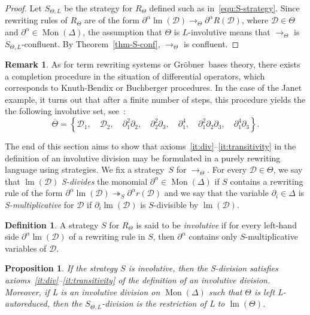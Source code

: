 \documentclass[11pt]{article}
\newtheorem{proposition}[theorem]{Proposition}
\theoremstyle{definition}
\newtheorem{definition}[theorem]{Definition}
\newtheorem{remark}[theorem]{Remark}
\newcommand\G{Gröbner}
\newcommand\D{\mathcal{D}}
\DeclareMathOperator{\lm}{lm}
\newcommand\monBasis{\Mon(\Delta)}
\DeclareMathOperator{\Mon}{Mon}
\newcommand\parS{\twoheadrightarrow_S}
\newcommand\rewTheta{\to_\Theta}
\newcommand\RTheta{R_{\Theta}}
\newcommand\SThetaL{S_{\Theta,L}}
\begin{document}
\begin{proof}
  Let $\SThetaL$ be the strategy for $\RTheta$ defined such as
  in~\eqref{equ:S-strategy}. Since rewriting rules of $\RTheta$ are of
  the form $\partial^\alpha\lm(\D)\rewTheta\partial^\alpha R(\D)$, where
  $\D\in\Theta$ and $\partial^\alpha\in\monBasis$, the assumption that
  $\Theta$ is $L$-involutive means that $\rewTheta$ is
  $\SThetaL$-confluent. By Theorem~\ref{thm-S-conf}, $\rewTheta$ is
  confluent.
\end{proof}
\smallskip

\begin{remark}
  As for term rewriting systems or \G\ bases theory, there exists a
  completion procedure in the situation of differential operators, which
  corresponds to Knuth-Bendix or Buchberger procedures. In the case of 
  the Janet example, it turns out that after a finite number of steps,
  this procedure yields the the following involutive set,
  see~\cite{MR1308976}:
  \[\overline{\Theta}=\left\{\D_1,\quad\D_2,\quad\partial_1^2\partial_2,
  \quad\partial_2^2\partial_3,\quad\partial_1^4,\quad\partial_1^2
  \partial_2\partial_3,\quad\partial_1^4\partial_3\right\}.\]
\end{remark}
\medskip

The end of this section aims to show that
axioms~\ref{it:div}--\ref{it:transitivity} in the definition of an
involutive division may be formulated in a purely rewriting language
using strategies. We fix a strategy~$S$ for $\rewTheta$. For every
$\D\in\Theta$, we say that $\lm(\D)$ {\em S-divides} the monomial
$\partial^\alpha\in\monBasis$ if $S$ contains a rewriting rule of the
form $\partial^\alpha\lm(\D)\parS\partial^\alpha r(\D)$ and we say that
the variable $\partial_i\in\Delta$ is {\em S-multiplicative} for $\D$ if
$\partial_i\lm(\D)$ is $S$-divisible by $\lm(\D)$. 
\smallskip

\begin{definition}
  A strategy $S$ for $\RTheta$ is said to be {\em involutive} if for
  every left-hand side $\partial^\alpha\lm(\D)$ of a rewriting rule in
  $S$, then $\partial^\alpha$ contains only $S$-multiplicative variables
  of $\D$.
\end{definition}
\smallskip

\begin{proposition}
  If the strategy $S$ is involutive, then the S-division satisfies
  axioms~\ref{it:div}--\ref{it:transitivity} of the definition of an
  involutive division. Moreover, if L is an involutive division on
  $\monBasis$ such that $\Theta$ is left L-autoreduced, then the
  $\SThetaL$-division is the restriction of L to $\lm(\Theta)$.
\end{proposition}
\end{document}
